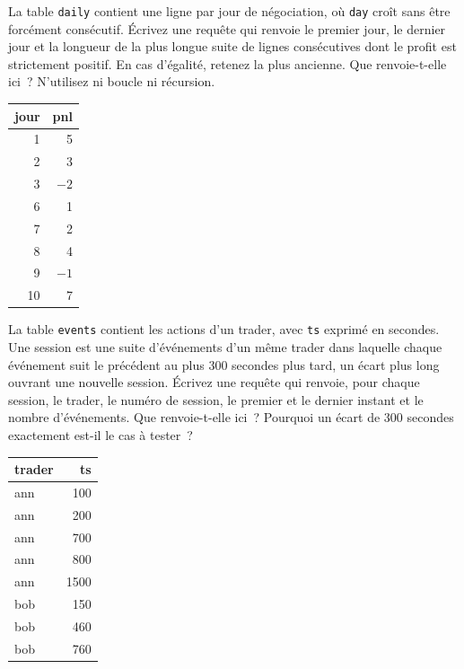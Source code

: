 \begin{question}\label{iq:iv3:sql-and-data:18}
La table \texttt{daily} contient une ligne par jour de négociation, où \texttt{day} croît sans être forcément consécutif. Écrivez une requête qui renvoie le premier jour, le dernier jour et la longueur de la plus longue suite de lignes consécutives dont le profit est strictement positif. En cas d'égalité, retenez la plus ancienne. Que renvoie-t-elle ici~? N'utilisez ni boucle ni récursion.
\begin{center}\small
\begin{tabular}{rr}
jour & pnl\\\hline
1 & 5\\
2 & 3\\
3 & $-2$\\
6 & 1\\
7 & 2\\
8 & 4\\
9 & $-1$\\
10 & 7
\end{tabular}
\end{center}
\end{question}

\begin{question}\label{iq:iv3:sql-and-data:19}
La table \texttt{events} contient les actions d'un trader, avec \texttt{ts} exprimé en secondes. Une session est une suite d'événements d'un même trader dans laquelle chaque événement suit le précédent au plus 300 secondes plus tard, un écart plus long ouvrant une nouvelle session. Écrivez une requête qui renvoie, pour chaque session, le trader, le numéro de session, le premier et le dernier instant et le nombre d'événements. Que renvoie-t-elle ici~? Pourquoi un écart de 300 secondes exactement est-il le cas à tester~?
\begin{center}\small
\begin{tabular}{lr}
trader & ts\\\hline
ann & 100\\
ann & 200\\
ann & 700\\
ann & 800\\
ann & 1500\\
bob & 150\\
bob & 460\\
bob & 760
\end{tabular}
\end{center}
\end{question}

